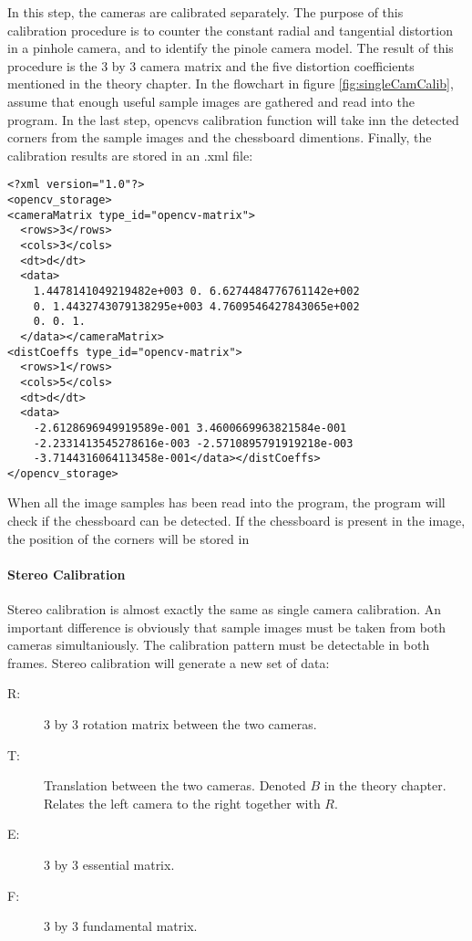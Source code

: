 In this step, the cameras are calibrated separately.  The purpose of this calibration procedure is to counter the constant radial and tangential distortion in a pinhole camera, and to identify the pinole camera model. The result of this procedure is the 3 by 3 camera matrix and the five distortion coefficients mentioned in the theory chapter. In the flowchart in figure \ref{fig:singleCamCalib}, assume that enough useful sample images are gathered and read into the program. In the last step, \gls{opencv}s calibration function will take inn the detected corners from the sample images and the chessboard dimentions. Finally, the calibration results are stored in an .xml file:

\begin{verbatim}
<?xml version="1.0"?>
<opencv_storage>
<cameraMatrix type_id="opencv-matrix">
  <rows>3</rows>
  <cols>3</cols>
  <dt>d</dt>
  <data>
    1.4478141049219482e+003 0. 6.6274484776761142e+002 
    0. 1.4432743079138295e+003 4.7609546427843065e+002 
    0. 0. 1.
  </data></cameraMatrix>
<distCoeffs type_id="opencv-matrix">
  <rows>1</rows>
  <cols>5</cols>
  <dt>d</dt>
  <data>
    -2.6128696949919589e-001 3.4600669963821584e-001
    -2.2331413545278616e-003 -2.5710895791919218e-003
    -3.7144316064113458e-001</data></distCoeffs>
</opencv_storage>
\end{verbatim}

\newpage



When all the image samples has been read into the program, the program will check if the chessboard can be detected. If the chessboard is present in the image, the position of the corners will be stored in  

\paragraph{Stereo Calibration}

Stereo calibration is almost exactly the same as single camera calibration. An important difference is obviously that sample images must be taken from both cameras simultaniously. The calibration pattern must be detectable in both frames. Stereo calibration will generate a new set of data:

\begin{description}
	\item[R: ] 3 by 3 rotation matrix between the two cameras.
	\item[T: ] Translation between the two cameras. Denoted $B$ in the theory chapter. Relates the left camera to the right together with $R$. 
	\item[E: ] 3 by 3 essential matrix.
	\item[F: ] 3 by 3 fundamental matrix.
\end{description}

